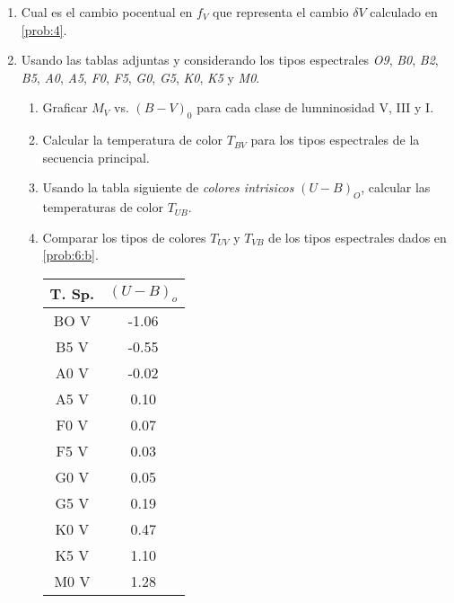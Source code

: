 \documentclass[12pt,spanish,a4paper]{practice}
\begin{document}
\begin{enumerate}[wide, labelwidth=!, labelindent=0pt, label=\textbf{\textrm{\arabic*)}}, ref=\arabic*]
    \item \label{prob:5} Cual es el cambio pocentual en $f_V$ que representa el cambio $\delta V$ calculado en \ref{prob:4}.

    \item \label{prob:6} Usando las tablas adjuntas y considerando los tipos espectrales \emph{O9},
    \emph{B0}, \emph{B2}, \emph{B5}, \emph{A0}, \emph{A5}, \emph{F0}, \emph{F5}, \emph{G0}, \emph{G5}, \emph{K0}, \emph{K5} y \emph{M0}.

        \begin{enumerate}
            \item Graficar $M_V$ vs. $\left(B-V\right)_{0}$ para cada clase de lumninosidad V, III y I.

            \item \label{prob:6:a} Calcular la temperatura de color $T_{BV}$ para los tipos espectrales de la secuencia principal.

            \item \label{prob:6:b} Usando la tabla siguiente de \emph{colores intrisicos} $\left(U-B\right)_O$, calcular las temperaturas de color $T_{UB}$.

            \item \label{prob:6:c} Comparar los tipos de colores $T_{UV}$ y $T_{VB}$ de los tipos espectrales dados en \ref{prob:6:b}.

                  \begin{table}
                    \centering
                    \begin{tabular}{c | c}
                          T. Sp.  & $\left(U-B\right)_{o}$ \\\hline
                          BO V  & -1.06 \\
                          B5 V  & -0.55 \\
                          A0 V  & -0.02 \\
                          A5 V  &  0.10 \\
                          F0 V  &  0.07 \\
                          F5 V  &  0.03 \\
                          G0 V  &  0.05 \\
                          G5 V  &  0.19 \\
                          K0 V  &  0.47 \\
                          K5 V  &  1.10 \\
                          M0 V  &  1.28
                    \end{tabular}
                \end{table}


\end{enumerate}
\end{enumerate}
\end{document}
